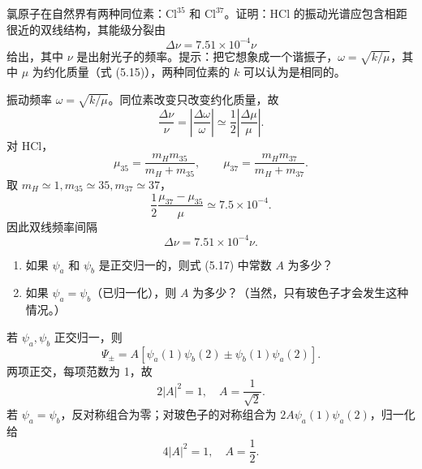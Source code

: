 \begin{question}
氯原子在自然界有两种同位素：$\mathrm{Cl}^{35}$ 和 $\mathrm{Cl}^{37}$。证明：$\mathrm{HCl}$ 的振动光谱应包含相距很近的双线结构，其能级分裂由
\[
\Delta \nu=7.51\times 10^{-4}\nu
\]
给出，其中 $\nu$ 是出射光子的频率。提示：把它想象成一个谐振子，$\omega=\sqrt{k/\mu}$，其中 $\mu$ 为约化质量（式 (5.15)），两种同位素的 $k$ 可以认为是相同的。

\par\smallskip
{}

\end{question}
\begin{solution}

振动频率 $\omega=\sqrt{k/\mu}$。同位素改变只改变约化质量，故
\[
\frac{\Delta\nu}{\nu}=\left|\frac{\Delta\omega}{\omega}\right|
\simeq \frac12\left|\frac{\Delta\mu}{\mu}\right|.
\]
对 HCl，
\[
\mu_{35}=\frac{m_Hm_{35}}{m_H+m_{35}},
\qquad
\mu_{37}=\frac{m_Hm_{37}}{m_H+m_{37}}.
\]
取 $m_H\simeq1,m_{35}\simeq35,m_{37}\simeq37$，
\[
\frac12\frac{\mu_{37}-\mu_{35}}{\mu}\simeq7.5\times10^{-4}.
\]
因此双线频率间隔
\[
\Delta\nu=7.51\times10^{-4}\nu.
\]

\end{solution}

\begin{question}
\begin{enumerate}
\item 如果 $\psi_a$ 和 $\psi_b$ 是正交归一的，则式 (5.17) 中常数 $A$ 为多少？
\item 如果 $\psi_a=\psi_b$（已归一化），则 $A$ 为多少？（当然，只有玻色子才会发生这种情况。）
\end{enumerate}

\par\smallskip
{}

\end{question}
\begin{solution}

若 $\psi_a,\psi_b$ 正交归一，则
\[
\Psi_\pm=A[\psi_a(1)\psi_b(2)\pm\psi_b(1)\psi_a(2)].
\]
两项正交，每项范数为 1，故
\[
2|A|^2=1,
\quad A=\frac1{\sqrt2}.
\]
若 $\psi_a=\psi_b$，反对称组合为零；对玻色子的对称组合为 $2A\psi_a(1)\psi_a(2)$，归一化给
\[
4|A|^2=1,
\quad A=\frac12.
\]

\end{solution}

